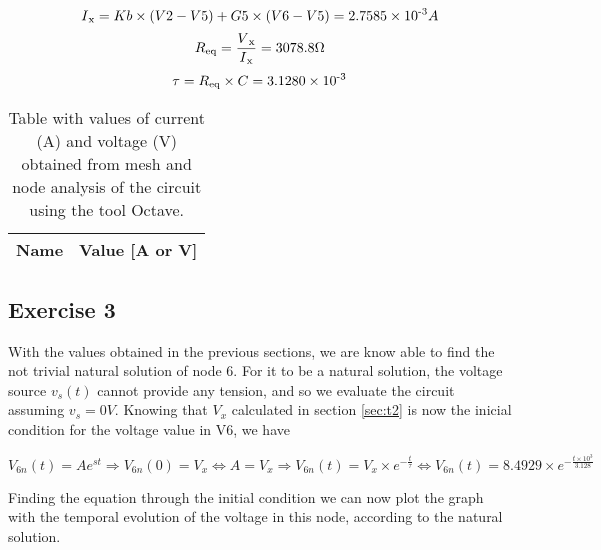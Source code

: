\vspace{-5mm}
\begin{equation}
I\textsubscript{x} = Kb \times(V2-V5) + G5 \times (V6-V5) = 2.7585 \times 10\textsuperscript{-3} A
\end{equation}
\vspace{-3mm}
\begin{equation}
 R\textsubscript{eq} = \frac{V\textsubscript{x}}{I\textsubscript{x}} = 3078.8  \Omega
\end{equation}
\vspace{-3mm}
\begin{equation}
\tau =  R\textsubscript{eq}\times C = 3.1280\times 10\textsuperscript{-3}
\end{equation}
\vspace{-5mm}
\begin{table}[h]
    \centering
    \begin{tabular}{|l|r|}
      \hline    
      {\bf Name} & {\bf Value [A or V]} \\ \hline
      
    \end{tabular}
    \caption{Table with values of current (A) and voltage (V) obtained from mesh and node analysis of the circuit using the tool Octave.}
    \label{tab:oct2}
\end{table}



\vspace{-7mm}
\subsection{Exercise 3}

With the values obtained in the previous sections, we are know able to find the not trivial natural solution of node 6.
For it to be a natural solution, the voltage source $v_s(t)$ cannot provide any tension, and so we evaluate 
the circuit assuming $v_s = 0 V$.
Knowing that $V_x$ calculated in section \ref{sec:t2} is now the inicial condition for the voltage value in V6, we have

\vspace{-7mm}
\begin{equation}
    V_{6n} (t) = A e^{st} \Rightarrow V_{6n} (0) = V_x \Leftrightarrow A = V_x \Rightarrow V_{6n} (t) = V_x \times e^{-\frac{t}{\tau}} \Leftrightarrow V_{6n} (t) = 8.4929\times e^{-\frac{t\times 10^3}{3.128}}
\end{equation}

\vspace{-1mm}
Finding the equation through the initial condition we can now plot the graph with the temporal evolution of the voltage 
in this node, according to the natural solution.  

